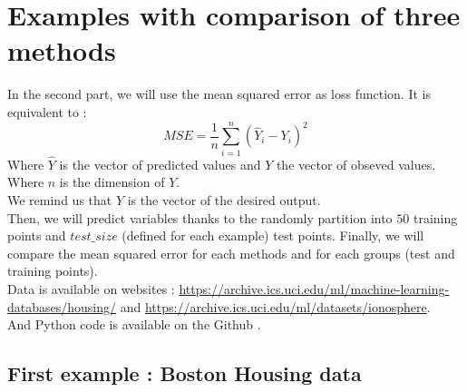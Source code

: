 \documentclass{article}
\begin{document}

\section{Examples with comparison of three methods}
In the second part, we will use the mean squared error as loss function. It is equivalent to :
 \[MSE = \frac{1}{n} \sum_{i=1}^n (\hat{Y}_i-Y_i)^2\]
 Where $\hat{Y}$ is the vector of predicted values and $Y$ the vector of obseved values. Where $n$ is the dimension of $Y$.\\
 We remind us that $Y$ is the vector of the desired output.\\
 Then, we will predict variables thanks to the randomly partition into $50$ training points and $test\_size$ (defined for each example) test points. Finally, we will compare the mean squared error for each methods and for each groups (test and training points).\\
 Data is available on websites : \href{https://archive.ics.uci.edu/ml/machine-learning-databases/housing/}{https://archive.ics.uci.edu/ml/machine-learning-databases/housing/}\cite{house} and \href{https://archive.ics.uci.edu/ml/datasets/ionosphere}{https://archive.ics.uci.edu/ml/datasets/ionosphere}\cite{iono}. \\
 And Python code is available on the Github \cite{code}.

\subsection{First example : Boston Housing data}
\end{document}
